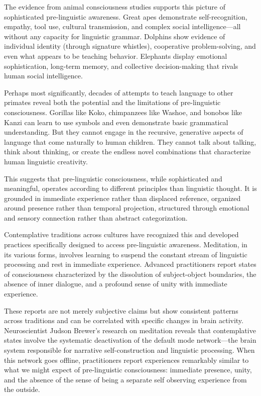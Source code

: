 The evidence from animal consciousness studies supports this picture of sophisticated pre-linguistic awareness. Great apes demonstrate self-recognition, empathy, tool use, cultural transmission, and complex social intelligence—all without any capacity for linguistic grammar. Dolphins show evidence of individual identity (through signature whistles), cooperative problem-solving, and even what appears to be teaching behavior. Elephants display emotional sophistication, long-term memory, and collective decision-making that rivals human social intelligence.

Perhaps most significantly, decades of attempts to teach language to other primates reveal both the potential and the limitations of pre-linguistic consciousness. Gorillas like Koko, chimpanzees like Washoe, and bonobos like Kanzi can learn to use symbols and even demonstrate basic grammatical understanding. But they cannot engage in the recursive, generative aspects of language that come naturally to human children. They cannot talk about talking, think about thinking, or create the endless novel combinations that characterize human linguistic creativity.

This suggests that pre-linguistic consciousness, while sophisticated and meaningful, operates according to different principles than linguistic thought. It is grounded in immediate experience rather than displaced reference, organized around presence rather than temporal projection, structured through emotional and sensory connection rather than abstract categorization.

Contemplative traditions across cultures have recognized this and developed practices specifically designed to access pre-linguistic awareness. Meditation, in its various forms, involves learning to suspend the constant stream of linguistic processing and rest in immediate experience. Advanced practitioners report states of consciousness characterized by the dissolution of subject-object boundaries, the absence of inner dialogue, and a profound sense of unity with immediate experience.

These reports are not merely subjective claims but show consistent patterns across traditions and can be correlated with specific changes in brain activity. Neuroscientist Judson Brewer's research on meditation reveals that contemplative states involve the systematic deactivation of the default mode network—the brain system responsible for narrative self-construction and linguistic processing. When this network goes offline, practitioners report experiences remarkably similar to what we might expect of pre-linguistic consciousness: immediate presence, unity, and the absence of the sense of being a separate self observing experience from the outside.


